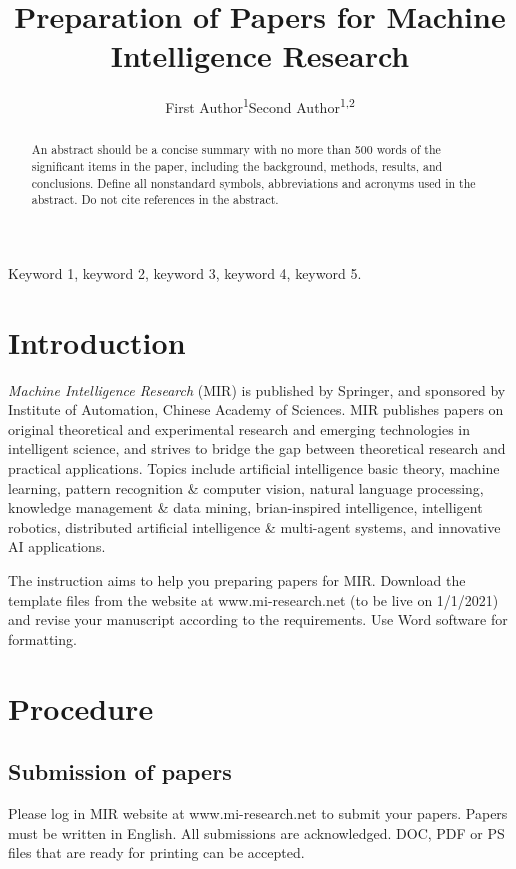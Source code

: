 \documentclass[journal,a4paper]{IEEEtran}
\title{Preparation of Papers for Machine Intelligence Research}
\author{First Author\textsuperscript{1}\qquad Second Author\textsuperscript{1,2}}
\begin{document}
\begin{abstract}
An abstract should be a concise summary with no more than 500 words of the significant items in the paper, including the background, methods, results, and conclusions. Define all nonstandard symbols, abbreviations and acronyms used in the abstract. Do not cite references in the abstract.
\end{abstract}

\begin{IEEEkeywords}
Keyword 1, keyword 2, keyword 3, keyword 4, keyword 5.
\end{IEEEkeywords}

\maketitle

\section{Introduction}

\textit{Machine Intelligence Research} (MIR) is published by Springer, and sponsored by Institute of Automation, Chinese Academy of Sciences. MIR publishes papers on original theoretical and experimental research and emerging technologies in intelligent science, and strives to bridge the gap between theoretical research and practical applications. Topics include artificial intelligence basic theory, machine learning, pattern recognition \& computer vision, natural language processing, knowledge management \& data mining, brian-inspired intelligence, intelligent robotics, distributed artificial intelligence \& multi-agent systems, and innovative AI applications.

The instruction aims to help you preparing papers for MIR. Download the template files from the website at www.mi-research.net (to be live on 1/1/2021) and revise your manuscript according to the requirements. Use Word software for formatting.

\section{Procedure}

\subsection{Submission of papers}

Please log in MIR website at www.mi-research.net to submit your papers. Papers must be written in English. All submissions are acknowledged. DOC, PDF or PS files that are ready for printing can be accepted.
\end{document}
